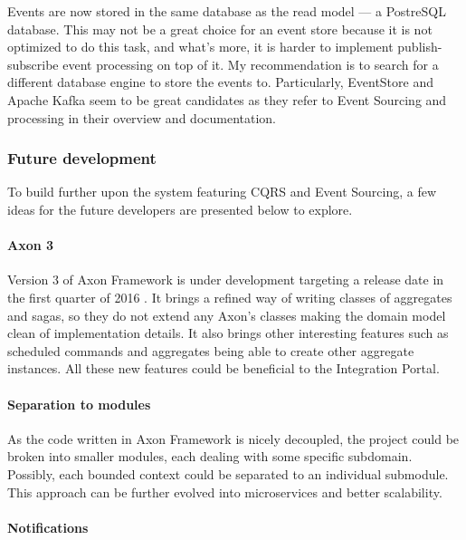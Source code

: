 \documentclass{book}
\begin{document}
Events are now stored in the same database as the read model --- a
PostreSQL database. This may not be a great choice for an event store
because it is not optimized to do this task, and what's more, it is
harder to implement publish-subscribe event processing on top of it. My
recommendation is to search for a different database engine to store the
events to. Particularly, EventStore \cite{eventstore} and Apache Kafka
\cite{kafka} seem to be great candidates as they refer to Event Sourcing
and processing in their overview and documentation.


\subsubsection{Future development}\label{future-development}

To build further upon the system featuring CQRS and Event Sourcing, a
few ideas for the future developers are presented below to explore.

\paragraph{Axon 3}\label{axon-3}

Version 3 of Axon Framework is under development targeting a release
date in the first quarter of 2016 \cite{axon}. It brings a refined way
of writing classes of aggregates and sagas, so they do not extend any
Axon's classes making the domain model clean of implementation details.
It also brings other interesting features such as scheduled commands and
aggregates being able to create other aggregate instances. All these new
features could be beneficial to the Integration Portal.

\paragraph{Separation to modules}\label{separation-to-modules}

As the code written in Axon Framework is nicely decoupled, the project
could be broken into smaller modules, each dealing with some specific
subdomain. Possibly, each bounded context could be separated to an
individual submodule. This approach can be further evolved into
microservices and better scalability.

\paragraph{Notifications}\label{notifications}
\end{document}
